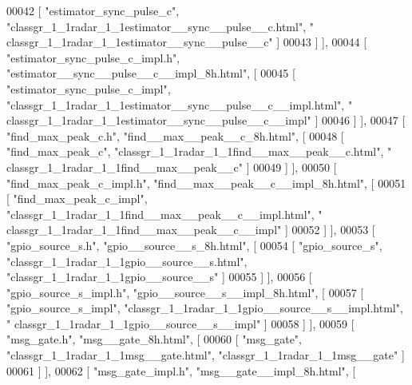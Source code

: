 \begin{DoxyCode}
00042       [ \textcolor{stringliteral}{"estimator\_sync\_pulse\_c"}, \textcolor{stringliteral}{"classgr\_1\_1radar\_1\_1estimator\_\_sync\_\_pulse\_\_c.html"}, \textcolor{stringliteral}{"
      classgr\_1\_1radar\_1\_1estimator\_\_sync\_\_pulse\_\_c"} ]
00043     ] ],
00044     [ \textcolor{stringliteral}{"estimator\_sync\_pulse\_c\_impl.h"}, \textcolor{stringliteral}{"estimator\_\_sync\_\_pulse\_\_c\_\_impl\_8h.html"}, [
00045       [ \textcolor{stringliteral}{"estimator\_sync\_pulse\_c\_impl"}, \textcolor{stringliteral}{"classgr\_1\_1radar\_1\_1estimator\_\_sync\_\_pulse\_\_c\_\_impl.html"}, \textcolor{stringliteral}{"
      classgr\_1\_1radar\_1\_1estimator\_\_sync\_\_pulse\_\_c\_\_impl"} ]
00046     ] ],
00047     [ \textcolor{stringliteral}{"find\_max\_peak\_c.h"}, \textcolor{stringliteral}{"find\_\_max\_\_peak\_\_c\_8h.html"}, [
00048       [ \textcolor{stringliteral}{"find\_max\_peak\_c"}, \textcolor{stringliteral}{"classgr\_1\_1radar\_1\_1find\_\_max\_\_peak\_\_c.html"}, \textcolor{stringliteral}{"
      classgr\_1\_1radar\_1\_1find\_\_max\_\_peak\_\_c"} ]
00049     ] ],
00050     [ \textcolor{stringliteral}{"find\_max\_peak\_c\_impl.h"}, \textcolor{stringliteral}{"find\_\_max\_\_peak\_\_c\_\_impl\_8h.html"}, [
00051       [ \textcolor{stringliteral}{"find\_max\_peak\_c\_impl"}, \textcolor{stringliteral}{"classgr\_1\_1radar\_1\_1find\_\_max\_\_peak\_\_c\_\_impl.html"}, \textcolor{stringliteral}{"
      classgr\_1\_1radar\_1\_1find\_\_max\_\_peak\_\_c\_\_impl"} ]
00052     ] ],
00053     [ \textcolor{stringliteral}{"gpio\_source\_s.h"}, \textcolor{stringliteral}{"gpio\_\_source\_\_s\_8h.html"}, [
00054       [ \textcolor{stringliteral}{"gpio\_source\_s"}, \textcolor{stringliteral}{"classgr\_1\_1radar\_1\_1gpio\_\_source\_\_s.html"}, \textcolor{stringliteral}{"classgr\_1\_1radar\_1\_1gpio\_\_source\_\_s"} 
      ]
00055     ] ],
00056     [ \textcolor{stringliteral}{"gpio\_source\_s\_impl.h"}, \textcolor{stringliteral}{"gpio\_\_source\_\_s\_\_impl\_8h.html"}, [
00057       [ \textcolor{stringliteral}{"gpio\_source\_s\_impl"}, \textcolor{stringliteral}{"classgr\_1\_1radar\_1\_1gpio\_\_source\_\_s\_\_impl.html"}, \textcolor{stringliteral}{"
      classgr\_1\_1radar\_1\_1gpio\_\_source\_\_s\_\_impl"} ]
00058     ] ],
00059     [ \textcolor{stringliteral}{"msg\_gate.h"}, \textcolor{stringliteral}{"msg\_\_gate\_8h.html"}, [
00060       [ \textcolor{stringliteral}{"msg\_gate"}, \textcolor{stringliteral}{"classgr\_1\_1radar\_1\_1msg\_\_gate.html"}, \textcolor{stringliteral}{"classgr\_1\_1radar\_1\_1msg\_\_gate"} ]
00061     ] ],
00062     [ \textcolor{stringliteral}{"msg\_gate\_impl.h"}, \textcolor{stringliteral}{"msg\_\_gate\_\_impl\_8h.html"}, [

\end{DoxyCode}
